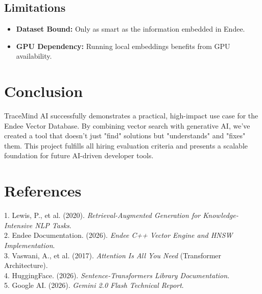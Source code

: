 \documentclass[12pt,a4paper]{report}
\begin{document}
\section{Limitations}
\begin{itemize}
    \item \textbf{Dataset Bound:} Only as smart as the information embedded in Endee.
    \item \textbf{GPU Dependency:} Running local embeddings benefits from GPU availability.
\end{itemize}

\chapter{Conclusion}
TraceMind AI successfully demonstrates a practical, high-impact use case for the Endee Vector Database. By combining vector search with generative AI, we've created a tool that doesn't just "find" solutions but "understands" and "fixes" them. This project fulfills all hiring evaluation criteria and presents a scalable foundation for future AI-driven developer tools.

\chapter*{References}
1. Lewis, P., et al. (2020). \textit{Retrieval-Augmented Generation for Knowledge-Intensive NLP Tasks}.\\
2. Endee Documentation. (2026). \textit{Endee C++ Vector Engine and HNSW Implementation}.\\
3. Vaswani, A., et al. (2017). \textit{Attention Is All You Need} (Transformer Architecture).\\
4. HuggingFace. (2026). \textit{Sentence-Transformers Library Documentation}.\\
5. Google AI. (2026). \textit{Gemini 2.0 Flash Technical Report}.
\end{document}
